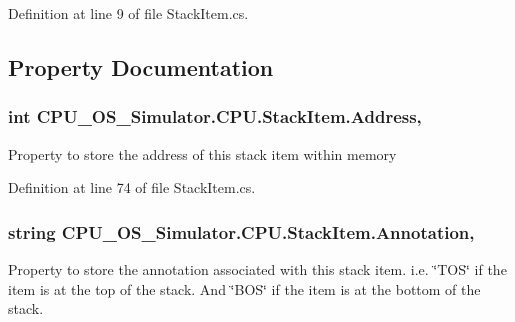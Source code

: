 Definition at line 9 of file Stack\+Item.\+cs.



\subsection{Property Documentation}
\hypertarget{class_c_p_u___o_s___simulator_1_1_c_p_u_1_1_stack_item_a44f4c5bd346e25e81c54b01012768bc5}{}
\subsubsection[{Address}]{\setlength{\rightskip}{0pt plus 5cm}int C\+P\+U\+\_\+\+O\+S\+\_\+\+Simulator.\+C\+P\+U.\+Stack\+Item.\+Address\hspace{0.3cm}{\ttfamily [get]}, {\ttfamily [set]}}\label{class_c_p_u___o_s___simulator_1_1_c_p_u_1_1_stack_item_a44f4c5bd346e25e81c54b01012768bc5}


Property to store the address of this stack item within memory 



Definition at line 74 of file Stack\+Item.\+cs.

\hypertarget{class_c_p_u___o_s___simulator_1_1_c_p_u_1_1_stack_item_a13f182fa7a19bcb7d78aadbd4cc04c98}{}
\subsubsection[{Annotation}]{\setlength{\rightskip}{0pt plus 5cm}string C\+P\+U\+\_\+\+O\+S\+\_\+\+Simulator.\+C\+P\+U.\+Stack\+Item.\+Annotation\hspace{0.3cm}{\ttfamily [get]}, {\ttfamily [set]}}\label{class_c_p_u___o_s___simulator_1_1_c_p_u_1_1_stack_item_a13f182fa7a19bcb7d78aadbd4cc04c98}


Property to store the annotation associated with this stack item. i.\+e. \char`\"{}\+T\+O\+S\char`\"{} if the item is at the top of the stack. And \char`\"{}\+B\+O\+S\char`\"{} if the item is at the bottom of the stack. 



